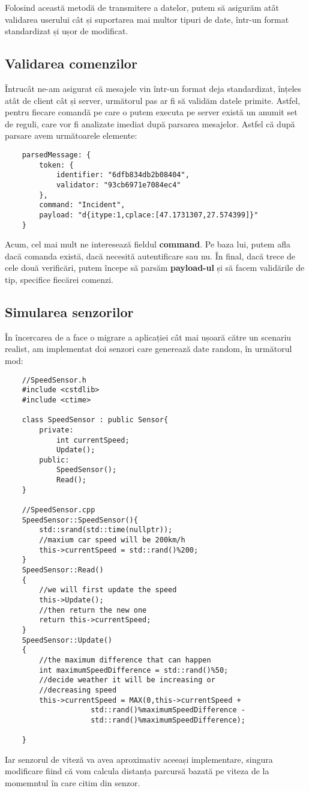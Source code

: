 \documentclass{article}
\begin{document}
Folosind această metodă de transmitere a datelor, putem să asigurăm atât validarea userului cât și suportarea mai multor tipuri de date, într-un format standardizat și ușor de modificat.


\subsection{Validarea comenzilor}
Întrucât ne-am asigurat că mesajele vin într-un format deja standardizat, înțeles atât de client cât și server, următorul pas ar fi să validăm datele primite. Astfel, pentru fiecare comandă pe care o putem executa pe server există un anumit set de reguli, care vor fi analizate imediat după parsarea mesajelor. Astfel că după parsare avem următoarele elemente:
\begin{lstlisting}
    parsedMessage: {
        token: {
            identifier: "6dfb834db2b08404",
            validator: "93cb6971e7084ec4"
        },
        command: "Incident",
        payload: "d{itype:1,cplace:[47.1731307,27.574399]}"
    }    
\end{lstlisting}
Acum, cel mai mult ne interesează fieldul \textbf{command}. Pe baza lui, putem afla dacă comanda există, dacă necesită autentificare sau nu. În final, dacă trece de cele două verificări, putem începe să parsăm \textbf{payload-ul} și să facem validările de tip, specifice fiecărei comenzi. 

\subsection{Simularea senzorilor}
În încercarea de a face o migrare a aplicației cât mai ușoară către un scenariu realist, am implementat doi senzori care generează date random, în următorul mod:
\vspace{0.5cm}
\begin{lstlisting}
    //SpeedSensor.h
    #include <cstdlib>
    #include <ctime>

    class SpeedSensor : public Sensor{
        private:
            int currentSpeed;
            Update();
        public:
            SpeedSensor();
            Read();
    }

    //SpeedSensor.cpp
    SpeedSensor::SpeedSensor(){
        std::srand(std::time(nullptr));
        //maxium car speed will be 200km/h
        this->currentSpeed = std::rand()%200;
    }
    SpeedSensor::Read()
    {
        //we will first update the speed 
        this->Update();
        //then return the new one
        return this->currentSpeed;
    }
    SpeedSensor::Update()
    {
        //the maximum difference that can happen
        int maximumSpeedDifference = std::rand()%50;
        //decide weather it will be increasing or 
        //decreasing speed
        this->currentSpeed = MAX(0,this->currentSpeed + 
                    std::rand()%maximumSpeedDifference - 
                    std::rand()%maximumSpeedDifference);
    
    }
\end{lstlisting}
Iar senzorul de viteză va avea aproximativ aceeași implementare, singura modificare fiind că vom calcula distanța parcursă bazată pe viteza de la momemntul în care citim din senzor. 
\end{document}
